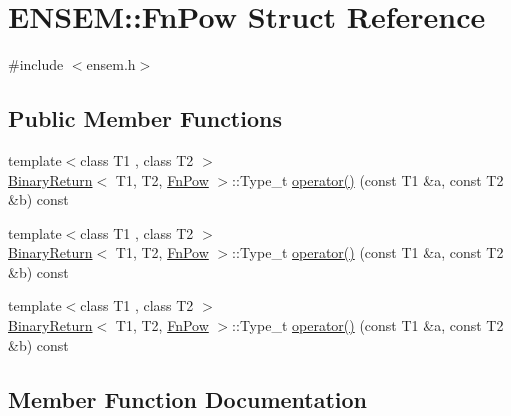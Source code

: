 \hypertarget{structENSEM_1_1FnPow}{}\section{E\+N\+S\+EM\+:\+:Fn\+Pow Struct Reference}
\label{structENSEM_1_1FnPow}


{\ttfamily \#include $<$ensem.\+h$>$}

\subsection*{Public Member Functions}
\begin{DoxyCompactItemize}
\item 
{\footnotesize template$<$class T1 , class T2 $>$ }\\\mbox{\hyperlink{structENSEM_1_1BinaryReturn}{Binary\+Return}}$<$ T1, T2, \mbox{\hyperlink{structENSEM_1_1FnPow}{Fn\+Pow}} $>$\+::Type\+\_\+t \mbox{\hyperlink{structENSEM_1_1FnPow_ad7f15cdc82e84e8bd8e07a4bc8dcb633}{operator()}} (const T1 \&a, const T2 \&b) const
\item 
{\footnotesize template$<$class T1 , class T2 $>$ }\\\mbox{\hyperlink{structENSEM_1_1BinaryReturn}{Binary\+Return}}$<$ T1, T2, \mbox{\hyperlink{structENSEM_1_1FnPow}{Fn\+Pow}} $>$\+::Type\+\_\+t \mbox{\hyperlink{structENSEM_1_1FnPow_ad7f15cdc82e84e8bd8e07a4bc8dcb633}{operator()}} (const T1 \&a, const T2 \&b) const
\item 
{\footnotesize template$<$class T1 , class T2 $>$ }\\\mbox{\hyperlink{structENSEM_1_1BinaryReturn}{Binary\+Return}}$<$ T1, T2, \mbox{\hyperlink{structENSEM_1_1FnPow}{Fn\+Pow}} $>$\+::Type\+\_\+t \mbox{\hyperlink{structENSEM_1_1FnPow_ad7f15cdc82e84e8bd8e07a4bc8dcb633}{operator()}} (const T1 \&a, const T2 \&b) const
\end{DoxyCompactItemize}


\subsection{Member Function Documentation}
\mbox{\label{structENSEM_1_1FnPow_ad7f15cdc82e84e8bd8e07a4bc8dcb633}} 

